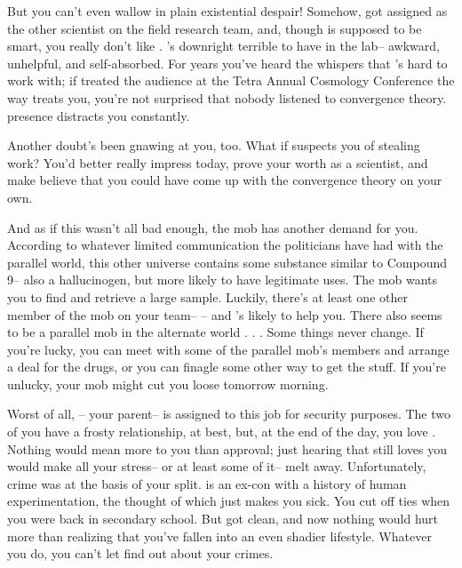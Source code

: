 \documentclass[char]{guildcamp3}
\begin{document}
But you can't even wallow in plain existential despair! Somehow, \cScientistTwo got assigned as the other scientist on the field research team, and, though \cScientistTwo{\they} is supposed to be smart, you really don't like \cScientistTwo{\them}. \cScientistTwo{\they}'s downright terrible to have in the lab-- awkward, unhelpful, and self-absorbed. For years you've heard the whispers that \cScientistTwo{\they}'s hard to work with; if \cScientistTwo{\they} treated the audience at the Tetra Annual Cosmology Conference the way \cScientistTwo{\they} treats you, you're not surprised that nobody listened to \cScientistTwo{\their} convergence theory. \cScientistTwo{\Their} presence distracts you constantly.

Another doubt's been gnawing at you, too. What if \cScientistTwo{\they} suspects you of stealing \cScientistTwo{\their} work? You'd better really impress \cScientistTwo{\them} today, prove your worth as a scientist, and make \cScientistTwo{\them} believe that you could have come up with the convergence theory on your own.

And as if this wasn't all bad enough, the mob has another demand for you. According to whatever limited communication the politicians have had with the parallel world, this other universe contains some substance similar to Compound 9-- also a hallucinogen, but more likely to have legitimate uses. The mob wants you to find and retrieve a large sample. Luckily, there's at least one other member of the mob on your team-- \cSpecialOpsTwo-- and \cSpecialOpsTwo{\they}'s likely to help you. There also seems to be a parallel mob in the alternate world . . . Some things never change. If you're lucky, you can meet with some of the parallel mob's members and arrange a deal for the drugs, or you can finagle some other way to get the stuff. If you're unlucky, your mob might cut you loose tomorrow morning.

Worst of all, \SpecialOpsOne-- your parent-- is assigned to this job for security purposes. The two of you have a frosty relationship, at best, but, at the end of the day, you love \cSpecialOpsOne{\them}. Nothing would mean more to you than \cSpecialOpsOne{\their} approval; just hearing that \cSpecialOpsOne{\they} still loves you would make all your stress-- or at least some of it-- melt away. Unfortunately, crime was at the basis of your split. \cSpecialOpsOne is an ex-con with a history of human experimentation, the thought of which just makes you sick. You cut off ties when you were back in secondary school. But\cSpecialOpsOne{\they} got clean, and now nothing would hurt \cSpecialOpsOne{\them} more than realizing that you've fallen into an even shadier lifestyle. Whatever you do, you can't let \cSpecialOpsOne{\them} find out about your crimes.
\end{document}
